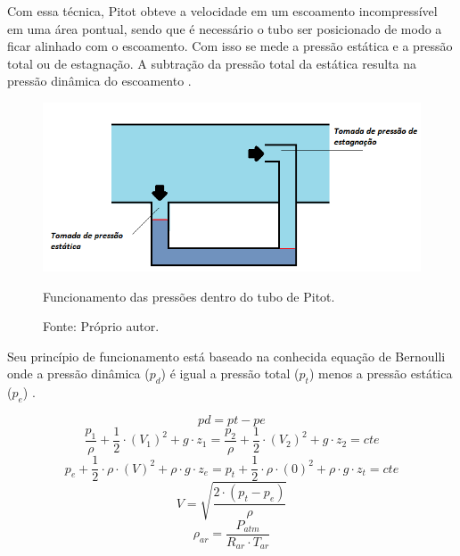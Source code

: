 Com essa técnica, Pitot obteve a velocidade em um escoamento incompressível em uma área pontual, sendo que 
é necessário o tubo ser posicionado de modo a ficar alinhado com o escoamento. Com isso se mede a pressão 
estática e a pressão total ou de estagnação. A subtração da pressão total da estática resulta na pressão 
dinâmica do escoamento \cite{pritchard2005fox}.

\begin{figure}[H]
\centering
\includegraphics[scale = 0.7]{figuras/pestagnacao}
\caption{Funcionamento das pressões dentro do tubo de Pitot.}
\caption*{Fonte: Próprio autor.}
\label{fig:pestagnacao}
\end{figure}

Seu princípio de funcionamento está baseado na conhecida equação de Bernoulli onde 
a pressão dinâmica ($p_{d}$) é igual a pressão total ($p_{t}$) menos a pressão estática ($p_{e}$) \cite{pritchard2005fox}.

\begin{equation}\label{eq:pdinamica}
    pd = pt - pe
\end{equation}
\begin{equation}\label{eq:bernoulli}
    \frac{p_{1}}{\rho} + \frac{1}{2} \cdot (V_{1})^{2} + g \cdot z_{1} = \frac{p_{2}}{\rho} + \frac{1}{2} \cdot (V_{2})^{2} + g \cdot z_{2} = cte  
\end{equation}
\begin{equation}\label{eq:binicial}
    p_{e} + \frac{1}{2} \cdot \rho \cdot (V)^{2} + \rho \cdot g \cdot z_{e} = p_{t} + \frac{1}{2} \cdot \rho \cdot (0)^{2} + \rho \cdot g \cdot z_{t} = cte  
\end{equation}
\begin{equation}\label{eq:velocidade}
    V = \sqrt{\frac{2 \cdot (p_{t} - p_{e})}{\rho}}
\end{equation}
\begin{equation}\label{eq:roar}
    \rho_{ar} = \frac{P_{atm}}{R_{ar} \cdot T_{ar}}
\end{equation}

